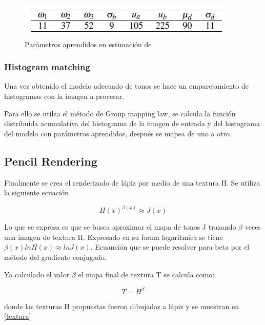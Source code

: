 \documentclass[letterpaper, 10 pt, conference]{ieeeconf}  %
\begin{document}
\begin{figure}[H]
\centering 
\includegraphics[width=\linewidth, scale=0.05]{images/param.png} 
\caption{Parámetros aprendidos en estimación de \cite{lu}}
    \label{param}
    \end{figure}

\subsubsection{Histogram matching}

Una vez obtenido el modelo adecuado de tonos se hace un emparejamiento de histogramas con la imagen a procesar.

Para ello se utilza el método de Group mapping law, se calcula la función distribuida acumulativa del histograma de la imagen de entrada y del histograma del modelo con parámetros aprendidos, después se mapea de uno a otro.



\subsection{Pencil Rendering}

Finalmente se crea el renderizado de lápiz por medio de una textura H. Se utiliza la siguiente ecuación

\begin{equation} \label{rend}
H(x)^{\beta(x)}  \approx J(x)
\end{equation}

Lo que se expresa es que se busca aproximar el mapa de tonos J trazando $\beta$ veces una imagen de textura H. Expresado en su forma logarítmica se tiene  $\beta(x)lnH(x) \approx lnJ(x)$. Ecuanción que se puede resolver para beta por el método del gradiente conjugado.

Ya calculado el valor $\beta$ el mapa final de textura T se calcula como:


\begin{equation} \label{grad}
T=H^{\beta}
\end{equation}

donde las texturas H propuestas fueron dibujadas a lápiz y se muestran en \ref{textura}
\end{document}
